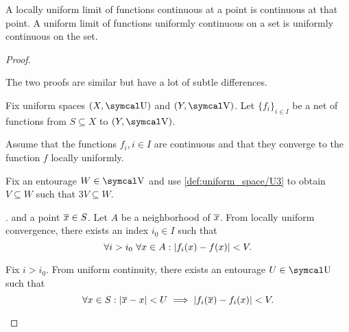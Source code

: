 \begin{proposition}\label{def:uniform_limit_of_continuous_functions}
  \mbox{}
  \begin{thmenum}
     A locally uniform limit of functions continuous at a point is continuous at that point.
     A uniform limit of functions uniformly continuous on a set is uniformly continuous on the set.
  \end{thmenum}
\end{proposition}
\begin{proof}
  \begin{description}
    The two proofs are similar but have a lot of subtle differences.

    Fix uniform spaces \( (X, \U) \) and \( (Y, \V) \). Let \( \{ f_i \}_{i \in I} \) be a net of functions from \( S \subseteq X \) to \( (Y, \V) \).

    \begin{description}
       Assume that the functions \( f_i, i \in I \) are continuous and that they converge to the function \( f \) locally uniformly.

      Fix an entourage \( W \in \V \) and use \cref{def:uniform_space/U3} to obtain \( V \subseteq W \) such that \( 3V \subseteq W \).

      . and a point \( \overline{x} \in S \). Let \( A \) be a neighborhood of \( \overline{x} \). From locally uniform convergence, there exists an index \( i_0 \in I \) such that
      \begin{equation*}
        \forall i > i_0 \ \forall x \in A : \left\vert f_i(x) - f(x) \right\vert < V.
      \end{equation*}

      Fix \( i > i_0 \). From uniform continuity, there exists an entourage \( U \in \U \) such that
      \begin{equation*}
        \forall x \in S : \left\vert \overline{x} - x \right\vert < U \implies \left\vert f_i(\overline{x}) - f_i(x) \right\vert < V.
      \end{equation*}


\end{description}
\end{description}
\end{proof}

